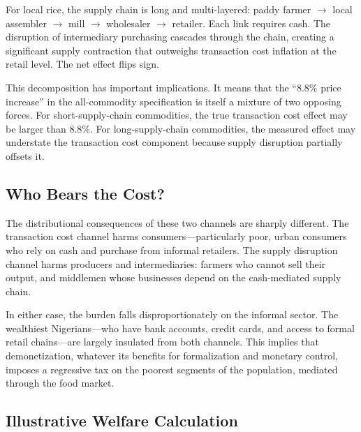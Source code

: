 \documentclass[12pt]{article}
\begin{document}
For local rice, the supply chain is long and multi-layered: paddy farmer $\rightarrow$ local assembler $\rightarrow$ mill $\rightarrow$ wholesaler $\rightarrow$ retailer. Each link requires cash. The disruption of intermediary purchasing cascades through the chain, creating a significant supply contraction that outweighs transaction cost inflation at the retail level. The net effect flips sign.

This decomposition has important implications. It means that the ``8.8\% price increase'' in the all-commodity specification is itself a mixture of two opposing forces. For short-supply-chain commodities, the true transaction cost effect may be larger than 8.8\%. For long-supply-chain commodities, the measured effect may understate the transaction cost component because supply disruption partially offsets it.

\subsection{Who Bears the Cost?}

The distributional consequences of these two channels are sharply different. The transaction cost channel harms consumers---particularly poor, urban consumers who rely on cash and purchase from informal retailers. The supply disruption channel harms producers and intermediaries: farmers who cannot sell their output, and middlemen whose businesses depend on the cash-mediated supply chain.

In either case, the burden falls disproportionately on the informal sector. The wealthiest Nigerians---who have bank accounts, credit cards, and access to formal retail chains---are largely insulated from both channels. This implies that demonetization, whatever its benefits for formalization and monetary control, imposes a regressive tax on the poorest segments of the population, mediated through the food market.

\subsection{Illustrative Welfare Calculation}
\end{document}
